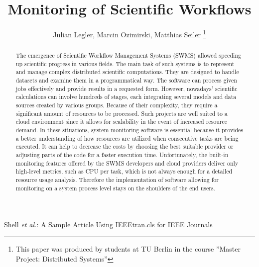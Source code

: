 \documentclass[lettersize,journal]{IEEEtran}
\begin{document}
	
\title{Monitoring of Scientific Workflows}

\author{Julian Legler, Marcin Ozimirski, Matthias Seiler
	\thanks{This paper was produced by students at TU Berlin in the course ''Master Project: Distributed Systems''}%
}

%
{Shell \MakeLowercase{\textit{et al.}}: A Sample Article Using IEEEtran.cls for IEEE Journals}


\maketitle

\begin{abstract}
	
The emergence of Scientific Workflow Management Systems (SWMS) allowed speeding up scientific progress in various fields. The main task of such systems is to represent and manage complex distributed scientific computations. They are designed to handle datasets and examine them in a programmatical way. The software can process given jobs effectively and provide results in a requested form. However, nowadays' scientific calculations can involve hundreds of stages, each integrating several models and data sources created by various groups. Because of their complexity, they require a significant amount of resources to be processed. Such projects are well suited to a cloud environment since it allows for scalability in the event of increased resource demand. In these situations, system monitoring software is essential because it provides a better understanding of how resources are utilized when consecutive tasks are being executed. It can help to decrease the costs by choosing the best suitable provider or adjusting parts of the code for a faster execution time. Unfortunately, the built-in monitoring features offered by the SWMS developers and cloud providers deliver only high-level metrics, such as CPU per task, which is not always enough for a detailed resource usage analysis. Therefore the implementation of software allowing for monitoring on a system process level stays on the shoulders of the end users. 

	
\end{abstract}
\end{document}
